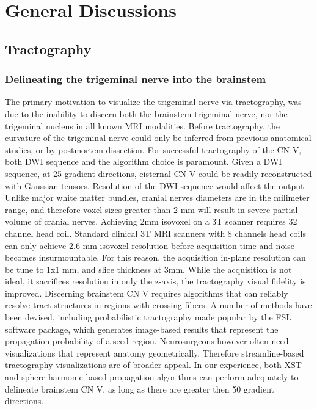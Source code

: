 \graphicspath{{images/discussions/}}

\chapter{General Discussions}
\section{Tractography}
\subsection{Delineating the trigeminal nerve into the brainstem}
The primary motivation to visualize the trigeminal nerve via tractography, was due to the inability to discern both the brainstem trigeminal nerve, nor the trigeminal nucleus in all known MRI modalities. Before tractography, the curvature of the trigeminal nerve could only be inferred from previous anatomical studies, or by postmortem dissection. 
For successful tractography of the CN V, both DWI sequence and the algorithm choice is paramount. Given a DWI sequence, at 25 gradient directions, cisternal CN V could be readily reconstructed with Gaussian tensors. Resolution of the DWI sequence would affect the output. Unlike major white matter bundles, cranial nerves diameters are in the milimeter range, and therefore voxel sizes greater than 2 mm will result in severe partial volume of cranial nerves. Achieving 2mm isovoxel on a 3T scanner requires 32 channel head coil. Standard clinical 3T MRI scanners with 8 channels head coils can only achieve 2.6 mm isovoxel resolution before acquisition time and noise becomes insurmountable. For this reason, the acquisition in-plane resolution can be tune to 1x1 mm, and slice thickness at 3mm. While the acquisition is not ideal, it sacrifices resolution in only the z-axis, the tractography visual fidelity is improved. 
Discerning brainstem CN V requires algorithms that can reliably resolve tract structures in regions with crossing fibers. A number of methods have been devised, including probabilistic tractography made popular by the FSL software package, which generates image-based results that represent the propagation probability of a seed region. Neurosurgeons however often need visualizations that represent anatomy geometrically. Therefore streamline-based tractography visualizations are of broader appeal. In our experience, both XST and sphere harmonic based propagation algorithms can perform adequately to delineate brainstem CN V, as long as there are greater then 50 gradient directions. 
